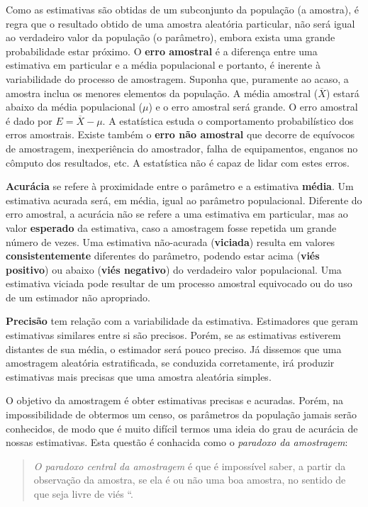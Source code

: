 \documentclass[
]{book}
\begin{document}
Como as estimativas são obtidas de um subconjunto da população (a amostra), é regra que o resultado obtido de uma amostra aleatória particular, não será igual ao verdadeiro valor da população (o parâmetro), embora exista uma grande probabilidade estar próximo. O \textbf{erro amostral} é a diferença entre uma estimativa em particular e a média populacional e portanto, é inerente à variabilidade do processo de amostragem. Suponha que, puramente ao acaso, a amostra inclua os menores elementos da população. A média amostral (\(\overline{X}\)) estará abaixo da média populacional (\(\mu\)) e o erro amostral será grande. O erro amostral é dado por \(E = \overline{X} - \mu\). A estatística estuda o comportamento probabilístico dos erros amostrais. Existe também o \textbf{erro não amostral} que decorre de equívocos de amostragem, inexperiência do amostrador, falha de equipamentos, enganos no cômputo dos resultados, etc. A estatística não é capaz de lidar com estes erros.

\textbf{Acurácia} se refere à proximidade entre o parâmetro e a estimativa \textbf{média}. Um estimativa acurada será, em média, igual ao parâmetro populacional. Diferente do erro amostral, a acurácia não se refere a uma estimativa em particular, mas ao valor \textbf{esperado} da estimativa, caso a amostragem fosse repetida um grande número de vezes.
Uma estimativa não-acurada (\textbf{viciada}) resulta em valores \textbf{consistentemente} diferentes do parâmetro, podendo estar acima (\textbf{viés positivo}) ou abaixo (\textbf{viés negativo}) do verdadeiro valor populacional. Uma estimativa viciada pode resultar de um processo amostral equivocado ou do uso de um estimador não apropriado.

\textbf{Precisão} tem relação com a variabilidade da estimativa. Estimadores que geram estimativas similares entre si são precisos. Porém, se as estimativas estiverem distantes de sua média, o estimador será pouco preciso. Já dissemos que uma amostragem aleatória estratificada, se conduzida corretamente, irá produzir estimativas mais precisas que uma amostra aleatória simples.

O objetivo da amostragem é obter estimativas precisas e acuradas. Porém, na impossibilidade de obtermos um censo, os parâmetros da população jamais serão conhecidos, de modo que é muito difícil termos uma ideia do grau de acurácia de nossas estimativas. Esta questão é conhacida como o \emph{paradoxo da amostragem}:

\begin{quote}
\emph{O paradoxo central da amostragem} é que é impossível saber, a partir da observação da amostra, se ela é ou não uma boa amostra, no sentido de que seja livre de viés \citep{stuart1984ideas}``.
\end{quote}
\end{document}
